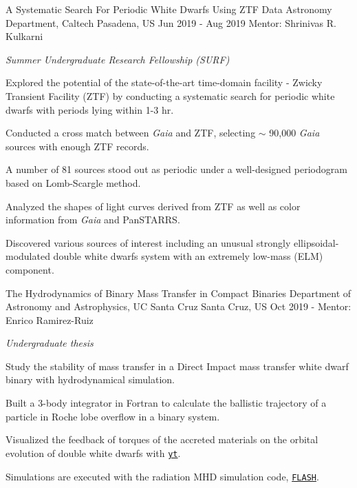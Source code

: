 \begin{cvexperiences}
\cvexperience
{A Systematic Search For Periodic White Dwarfs Using ZTF Data} %
{Astronomy Department, Caltech} %
{Pasadena, US} %
{Jun 2019 - Aug 2019} %
{Mentor: Shrinivas R. Kulkarni}
{ %
	\begin{cvitems}
		\item {\textit{Summer Undergraduate Research Fellowship (SURF)}}
		\item {Explored the potential of the state-of-the-art time-domain facility - Zwicky Transient Facility (ZTF) by conducting a systematic search for periodic white dwarfs with periods lying within 1-3 hr.}
		\item {Conducted a cross match between \textit{Gaia} and ZTF, selecting $\sim$ 90,000 \textit{Gaia} sources with enough ZTF records.}
		\item {A number of 81 sources stood out as periodic under a well-designed periodogram based on Lomb-Scargle method.}
		\item {Analyzed the shapes of light curves derived from ZTF as well as color information from \textit{Gaia} and PanSTARRS.}
		\item {Discovered various sources of interest including an unusual strongly ellipsoidal-modulated double white dwarfs system with an extremely low-mass (ELM) component.}
	\end{cvitems}
}

\cvexperience
{The Hydrodynamics of Binary Mass Transfer in Compact Binaries} %
{Department of Astronomy and Astrophysics, UC Santa Cruz} %
{Santa Cruz, US} %
{Oct 2019 -} %
{Mentor: Enrico Ramirez-Ruiz}
{ %
	\begin{cvitems}
		\item {\textit{Undergraduate thesis}}
		\item {Study the stability of mass transfer in a Direct Impact mass transfer white dwarf binary with hydrodynamical simulation.}
		\item {Built a 3-body integrator in Fortran to calculate the ballistic trajectory of a particle in Roche lobe overflow in a binary system.}
		\item {Visualized the feedback of torques of the accreted materials on the orbital evolution of double white dwarfs with \href{https://yt-project.org}{\texttt{yt}}.}
		\item {Simulations are executed with the radiation MHD simulation code, \href{http://flash.uchicago.edu/site/}{\texttt{FLASH}}.}
	\end{cvitems}
}

\end{cvexperiences}